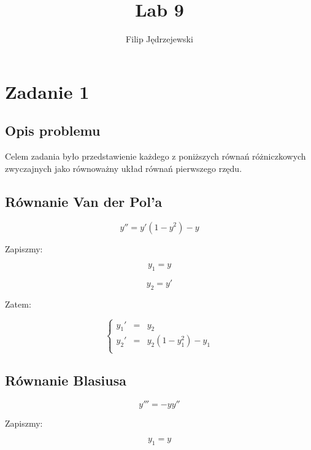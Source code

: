 \documentclass{article}
\title{Lab 9}
\author{Filip Jędrzejewski}
\begin{document}
	\maketitle
	
	\section*{Zadanie 1}
	
	\subsection*{Opis problemu}

	Celem zadania było przedstawienie każdego z poniższych równań różniczkowych zwyczajnych jako równoważny układ równań pierwszego rzędu.

	\subsection*{Równanie Van der Pol’a}

	\begin{equation}
		y'' = y' (1-y^2)-y
	\end{equation}

	Zapiszmy:

	\begin{equation}
		y_1 = y
	\end{equation}

	\begin{equation}
		y_2 = y'
	\end{equation}
	
	Zatem:

	\begin{equation}
		\left\{\begin{array}{rcl}
			y_1'&=&y_2\\
			y_2'&=&y_2(1-y_1^2)-y_1\\
			\end{array} \right.
	\end{equation}


	\subsection*{Równanie Blasiusa}

	\begin{equation}
		y''' = -yy''
	\end{equation}

	Zapiszmy:

	\begin{equation}
		y_1 = y
	\end{equation}
\end{document}
